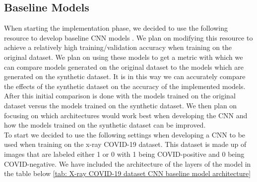 \subsection{Baseline Models}
When starting the implementation phase, we decided to use the following resource to develop baseline CNN models \cite{imageClassificationKeras}.  We plan on modifying this resource to achieve a relatively high training/validation accuracy when training on the original dataset.  We plan on using these models to get a metric with which we can compare models generated on the original dataset to the models which are generated on the synthetic dataset.  It is in this way we can accurately compare the effects of the synthetic dataset on the accuracy of the implemented models.
\\
After this initial comparison is done with the models trained on the original dataset versus the models trained on the synthetic dataset.  We then plan on focusing on which architectures would work best when developing the CNN and how the models trained on the synthetic dataset can be improved.
\\
To start we decided to use the following settings when developing a CNN to be used when training on the x-ray COVID-19 dataset.  This dataset is made up of images that are labeled either 1 or 0 with 1 being COVID-positive and 0 being COVID-negative.  We have included the architecture of the layers of the model in the table below \ref{tab: X-ray COVID-19 dataset CNN baseline model architecture}
\begin{table}[H]
    \centering
    \caption{ X-ray COVID-19 dataset CNN baseline model architecture}
    \label{tab: X-ray COVID-19 dataset CNN baseline model architecture}
\end{table}
